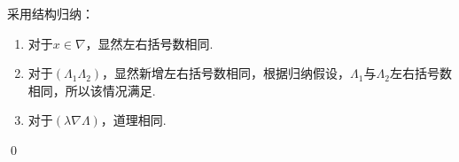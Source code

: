 \begin{pf} \rm 
    采用结构归纳：
    \begin{enumerate}
        \item 对于$x\in\nabla$，显然左右括号数相同.
        \item 对于$(\Lambda_1\Lambda_2)$，显然新增左右括号数相同，根据归纳假设，$\Lambda_1$与$\Lambda_2$左右括号数相同，所以该情况满足.
        \item 对于$(\lambda\nabla\Lambda)$，道理相同.
    \end{enumerate}
    \qed
\end{pf}